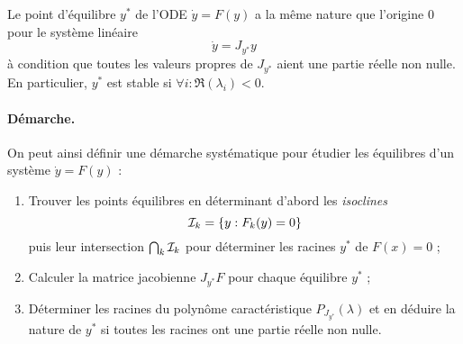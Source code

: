 \begin{theorem}
  Le point d'équilibre $y^*$ de l'ODE $\dot y = F(y)$ a la même nature que l'origine $0$ pour le système linéaire 
  $$
  \dot y = J_{y^*} y
  $$
  à condition que toutes les valeurs propres de $J_{y^*}$ aient une partie réelle non nulle. \\
  En particulier, $y^*$ est stable si $\forall i: \Re(\lambda_i) < 0$.
\end{theorem}

\paragraph*{Démarche.}
On peut ainsi définir une démarche systématique pour étudier les équilibres d'un système $\dot y = F(y)$ :
\begin{enumerate}
  \item Trouver les points équilibres en déterminant d'abord les {\em isoclines}
  $$
  \mathcal{I}_k = \{y : F_k(y) = 0\}
  $$
  puis leur intersection $\bigcap_k \mathcal{I}_k$ pour déterminer les racines $y^*$ de  $F(x) = 0$ ;
  \item Calculer la matrice jacobienne $J_{y^*} F$ pour chaque équilibre $y^*$ ;
  \item Déterminer les racines du polynôme caractéristique $P_{J_{y^*}}(\lambda)$ et en déduire la nature de $y^*$ si toutes les racines ont une partie réelle non nulle.
\end{enumerate}

